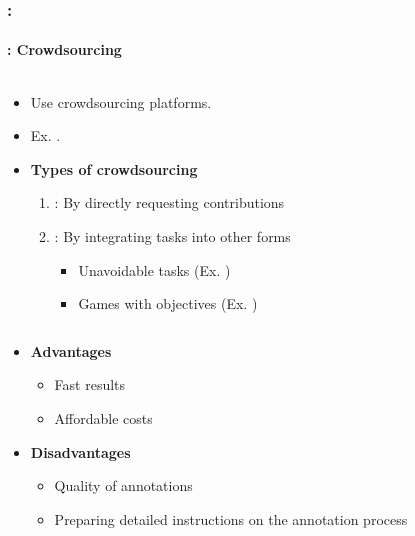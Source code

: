 \documentclass[xcolor=table]{beamer}
\begin{document}
\begin{frame}
	\frametitle{\insertshortsubtitle: \insertsection}
	\framesubtitle{\insertsubsection: Crowdsourcing}
	
	\begin{columns}
		\begin{column}{0.78\textwidth}
			\begin{itemize}
				\item Use crowdsourcing platforms.
				\item Ex. .
				\item \textbf{Types of crowdsourcing}
				\begin{enumerate}
					\item {}: By directly requesting contributions
					\item {}: By integrating tasks into other forms
					\begin{itemize}
						\item Unavoidable tasks (Ex. )
						\item Games with objectives (Ex. )
					\end{itemize}
				\end{enumerate}
			\end{itemize}
		\end{column}
		\begin{column}{0.22\textwidth}
		\end{column}
	\end{columns}
	
	\begin{itemize}
		\item \textbf{Advantages}
		\begin{itemize}
			\item Fast results
			\item Affordable costs
		\end{itemize}
		\item \textbf{Disadvantages}
		\begin{itemize}
			\item Quality of annotations
			\item Preparing detailed instructions on the annotation process
		\end{itemize}
	\end{itemize}

\end{frame}
\end{document}
